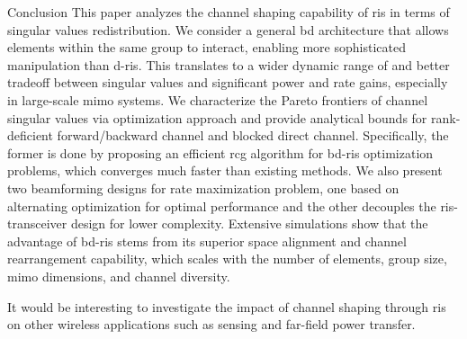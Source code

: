 \documentclass[journal]{IEEEtran}
\begin{document}
\begin{section}{Conclusion}
	This paper analyzes the channel shaping capability of \gls{ris} in terms of singular values redistribution.
	We consider a general \gls{bd} architecture that allows elements within the same group to interact, enabling more sophisticated manipulation than \gls{d}-\gls{ris}.
	This translates to a wider dynamic range of and better tradeoff between singular values and significant power and rate gains, especially in large-scale \gls{mimo} systems.
	We characterize the Pareto frontiers of channel singular values via optimization approach and provide analytical bounds for rank-deficient forward/backward channel and blocked direct channel.
	Specifically, the former is done by proposing an efficient \gls{rcg} algorithm for \gls{bd}-\gls{ris} optimization problems, which converges much faster than existing methods.
	We also present two beamforming designs for rate maximization problem, one based on alternating optimization for optimal performance and the other decouples the \gls{ris}-transceiver design for lower complexity.
	Extensive simulations show that the advantage of \gls{bd}-\gls{ris} stems from its superior space alignment and channel rearrangement capability, which scales with the number of elements, group size, \gls{mimo} dimensions, and channel diversity.

	It would be interesting to investigate the impact of channel shaping through \gls{ris} on other wireless applications such as sensing and far-field power transfer.
\end{section}

\end{document}
